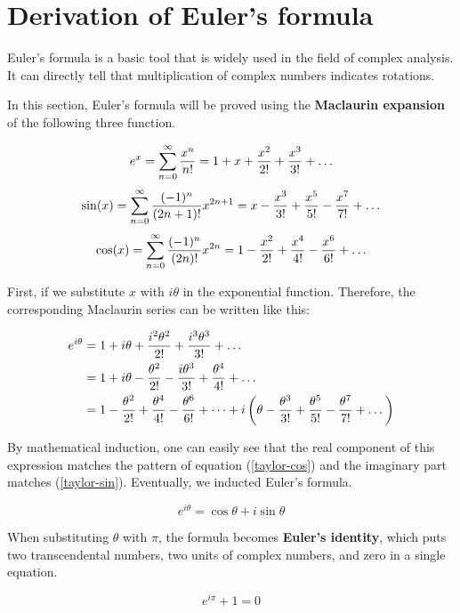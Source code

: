 \section{Derivation of Euler's formula}\label{eulers-formula-derivation}

Euler's formula is a basic tool that is widely used in the field of complex
analysis. It can directly tell that multiplication of complex numbers indicates
rotations.

In this section, Euler's formula will be proved using the \textbf{Maclaurin
expansion} of the following three function.

\begin{equation}
	e^x=\sum_{n=0}^\infty{x^n\over n!}
	=1+x+{x^2\over2!}+{x^3\over3!}+\dots
	\label{taylor-exp}
\end{equation}
\begin{equation}
	\sin(x)=\sum_{n=0}^\infty{(-1)^n\over(2n+1)!}x^{2n+1}
	=x-{x^3\over3!}+{x^5\over5!}-{x^7\over7!}+\dots
	\label{taylor-sin}
\end{equation}
\begin{equation}
	\cos(x)=\sum_{n=0}^\infty{(-1)^n\over(2n)!}x^{2n}
	=1-{x^2\over2!}+{x^4\over4!}-{x^6\over6!}+\dots
	\label{taylor-cos}
\end{equation}

First, if we substitute $x$ with $i\theta$ in the exponential function.
Therefore, the corresponding Maclaurin series can be written like this:

$$
\begin{aligned}
	e^{i\theta}
	&=1+i\theta+{i^2\theta^2\over2!}+{i^3\theta^3\over3!}+\dots \\
	&=1+i\theta-{\theta^2\over2!}-{i\theta^3\over3!}+{\theta^4\over4!}
	+\dots \\
	&=1-{\theta^2\over2!}+{\theta^4\over4!}-{\theta^6\over6!}+\dots
	+i\left(\theta-{\theta^3\over3!}+{\theta^5\over5!}-{\theta^7\over7!}
	+\dots\right)
\end{aligned}
$$

By mathematical induction, one can easily see that the real component of this
expression matches the pattern of equation (\ref{taylor-cos}) and the imaginary
part matches (\ref{taylor-sin}). Eventually, we inducted Euler's formula.

$$e^{i\theta}=\cos\theta+i\sin\theta$$

When substituting $\theta$ with $\pi$, the formula becomes \textbf{Euler's
identity}, which puts two transcendental numbers, two units of complex numbers,
and zero in a single equation.

$$e^{i\pi}+1=0$$
